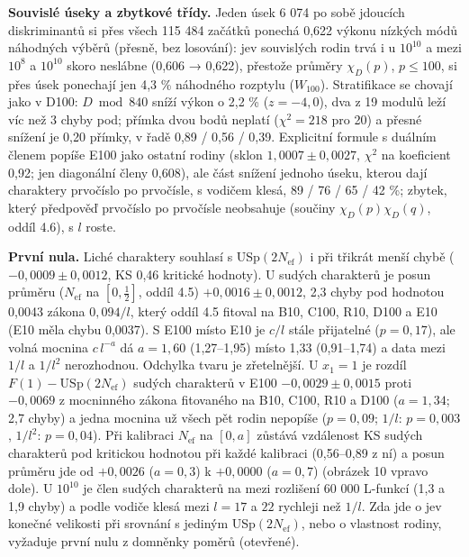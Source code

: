 \documentclass[
  10pt,
]{article}
\begin{document}
\textbf{Souvislé úseky a zbytkové třídy.} Jeden úsek 6 074 po sobě
jdoucích diskriminantů si přes všech 115 484 začátků ponechá 0,622
výkonu nízkých módů náhodných výběrů (přesně, bez losování): jev
souvislých rodin trvá i u \(10^{10}\) a mezi \(10^8\) a \(10^{10}\)
skoro neslábne (0,606 → 0,622), přestože průměry \(\chi_D(p)\),
\(p \le 100\), si přes úsek ponechají jen 4,3 \% náhodného rozptylu
(\(W_{100}\)). Stratifikace se chovají jako v D100: \(D \bmod 840\)
sníží výkon o 2,2 \% (\(z = -4{,}0\)), dva z 19 modulů leží víc než 3
chyby pod; přímka dvou bodů neplatí (\(\chi^2 = 218\) pro 20) a přesné
snížení je 0,20 přímky, v řadě 0,89 / 0,56 / 0,39. Explicitní formule s
duálním členem popíše E100 jako ostatní rodiny (sklon
\(1{,}0007 \pm 0{,}0027\), \(\chi^2\) na koeficient 0,92; jen diagonální
členy 0,608), ale část snížení jednoho úseku, kterou dají charaktery
prvočíslo po prvočísle, s vodičem klesá, 89 / 76 / 65 / 42 \%; zbytek,
který předpověď prvočíslo po prvočísle neobsahuje (součiny
\(\chi_D(p)\chi_D(q)\), oddíl 4.6), s \(l\) roste.

\textbf{První nula.} Liché charaktery souhlasí s
USp\((2N_{\mathrm{ef}})\) i při třikrát menší chybě
(\(-0{,}0009 \pm 0{,}0012\), KS 0,46 kritické hodnoty). U sudých
charakterů je posun průměru (\(N_{\mathrm{ef}}\) na \([0, \frac12]\),
oddíl 4.5) \(+0{,}0016 \pm 0{,}0012\), 2,3 chyby pod hodnotou 0,0043
zákona \(0{,}094/l\), který oddíl 4.5 fitoval na B10, C100, R10, D100 a
E10 (E10 měla chybu 0,0037). S E100 místo E10 je \(c/l\) stále
přijatelné (\(p = 0{,}17\)), ale volná mocnina \(c\,l^{-a}\) dá
\(a = 1{,}60\) (1,27--1,95) místo 1,33 (0,91--1,74) a data mezi \(1/l\)
a \(1/l^2\) nerozhodnou. Odchylka tvaru je zřetelnější. U \(x_1 = 1\) je
rozdíl \(F(1) - \mathrm{USp}(2N_{\mathrm{ef}})\) sudých charakterů v
E100 \(-0{,}0029 \pm 0{,}0015\) proti \(-0{,}0069\) z mocninného zákona
fitovaného na B10, C100, R10 a D100 (\(a = 1{,}34\); 2,7 chyby) a jedna
mocnina už všech pět rodin nepopíše (\(p = 0{,}09\); \(1/l\):
\(p = 0{,}003\), \(1/l^2\): \(p = 0{,}04\)). Při kalibraci
\(N_{\mathrm{ef}}\) na \([0, a]\) zůstává vzdálenost KS sudých
charakterů pod kritickou hodnotou při každé kalibraci (0,56--0,89 z ní)
a posun průměru jde od \(+0{,}0026\) (\(a = 0{,}3\)) k \(+0{,}0000\)
(\(a = 0{,}7\)) (obrázek 10 vpravo dole). U \(10^{10}\) je člen sudých
charakterů na mezi rozlišení 60 000 L-funkcí (1,3 a 1,9 chyby) a podle
vodiče klesá mezi \(l = 17\) a \(22\) rychleji než \(1/l\). Zda jde o
jev konečné velikosti při srovnání s jediným USp\((2N_{\mathrm{ef}})\),
nebo o vlastnost rodiny, vyžaduje první nulu z domněnky poměrů
(otevřené).
\end{document}
